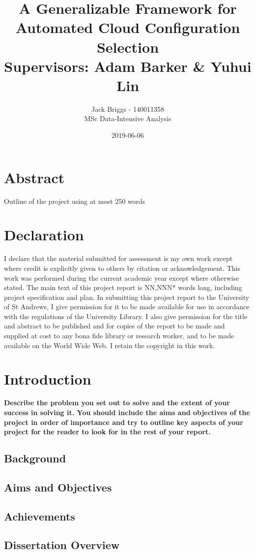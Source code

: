 \documentclass{article}
\title{\vspace{-2.0cm} A Generalizable Framework for Automated Cloud Configuration Selection \\ \vspace{0.5cm} \large Supervisors: Adam Barker \& Yuhui Lin}
\date{2019-06-06}
\author{Jack Briggs - 140011358 \\ MSc Data-Intensive Analysis}
\begin{document}
\maketitle
\newpage
\section*{Abstract}
Outline of the project using at most 250 words
\newpage
\section*{Declaration}
I declare that the material submitted for assessment
is my own work except where credit is explicitly
given to others by citation or acknowledgement. This
work was performed during the current academic year
except where otherwise stated.
The main text of this project report is NN,NNN* words
long, including project specification and plan.
In submitting this project report to the University of St
Andrews, I give permission for it to be made
available for use in accordance with the regulations of the University Library. I also give permission for the title and abstract to be published and for copies of the report to be made and supplied at cost to any bona fide library or research worker, and to be made available on the World Wide Web. I retain the copyright in this work.
\newpage
\tableofcontents
\listoffigures
\newpage
\section{Introduction}
\textbf{Describe the problem you set out to solve and the extent
of your success in solving it. You should include the aims
and objectives of the project in order of importance and
try to outline key aspects of your project for the reader to look for in the rest of your report.}
\subsection{Background}
\subsection{Aims and Objectives}
\subsection{Achievements}
\subsection{Dissertation Overview}
\end{document}
